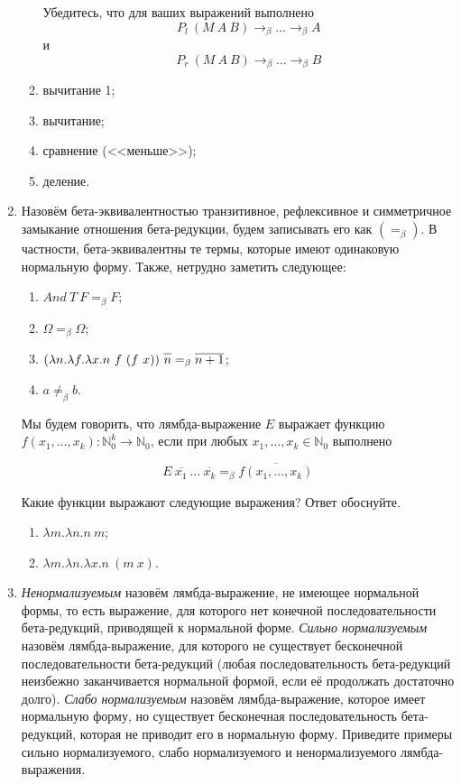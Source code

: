 \documentclass[10pt,a4paper,oneside]{article}
\begin{document}
\begin{enumerate}
\begin{enumerate}
Убедитесь, что для ваших выражений выполнено $$P_l\ (M\ A\ B) \rightarrow_\beta \dots \rightarrow_\beta A$$ и 
$$P_r\ (M\ A\ B) \rightarrow_\beta \dots \rightarrow_\beta B$$
\item вычитание 1;
\item вычитание;
\item сравнение (<<меньше>>);
\item деление.
\end{enumerate}

\item Назовём бета-эквивалентностью транзитивное, рефлексивное и симметричное замыкание отношения
бета-редукции, будем записывать его как $(=_\beta)$. В частности, бета-эквивалентны те термы,
которые имеют одинаковую нормальную форму.
Также, нетрудно заметить следующее:
\begin{enumerate}
\item $And\ T\ F =_\beta F$;
\item $\Omega =_\beta \Omega$;
\item $(\lambda n.\lambda f.\lambda x.n\ f\ (f\ x))\ \overline{n\vphantom{n+1}} =_\beta \overline{n+1}$;
\item $a \ne_\beta b$.
\end{enumerate}

Мы будем говорить, что лямбда-выражение $E$ выражает функцию $f(x_1,\dots,x_k): \mathbb{N}_0^k \rightarrow \mathbb{N}_0$,
если при любых $x_1,\dots,x_k \in \mathbb{N}_0$
выполнено

$$E\ \overline{x_1}\ \dots\ \overline{x_k} =_\beta \overline{f(x_1,\dots,x_k)}$$

Какие функции выражают следующие выражения? Ответ обоснуйте.
\begin{enumerate}
\item $\lambda m.\lambda n.n\ m$;
\item $\lambda m.\lambda n.\lambda x.n\ (m\ x)$.
\end{enumerate}

\item \emph{Ненормализуемым} назовём лямбда-выражение, не имеющее нормальной формы,
то есть выражение, для которого нет конечной последовательности бета-редукций,
приводящей к нормальной форме.
\emph{Сильно нормализуемым} назовём лямбда-выражение, для которого не существует бесконечной
последовательности бета-редукций (любая последовательность бета-редукций неизбежно 
заканчивается нормальной формой, если её продолжать достаточно долго).
\emph{Слабо нормализуемым} назовём лямбда-выражение, которое имеет нормальную форму,
но существует бесконечная последовательность бета-редукций, которая не приводит его
в нормальную форму. Приведите примеры сильно нормализуемого, слабо нормализуемого и 
ненормализуемого лямбда-выражения.
\end{enumerate}
\end{document}
